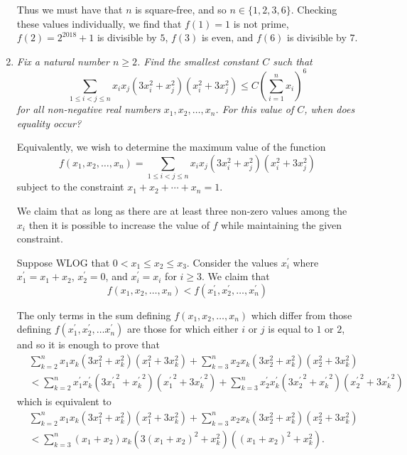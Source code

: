 \documentclass{article}
\begin{document}
\begin{enumerate}[1.]
Thus we must have that $n$ is square-free, and so $n \in \{1, 2, 3, 6\}$. Checking these values individually, we find that $f(1) = 1$ is not prime, $f(2) = 2^{2018} + 1$ is divisible by $5$, $f(3)$ is even, and $f(6)$ is divisible by $7$.


\vspace{6pt}
\item %
\textit{Fix a natural number $n \geq 2$. Find the smallest constant $C$ such that
\[
	 \sum_{1 \leq i < j \leq n} x_i x_j (3x_i^2 + x_j^2)(x_i^2 + 3x_j^2) \leq C {\left( \sum_{i = 1}^{n} x_i \right)}^6
\]
for all non-negative real numbers $x_1, x_2, \dots, x_n$. For this value of $C$, when does equality occur?}

Equivalently, we wish to determine the maximum value of the function
\[
	f(x_1, x_2, \dots, x_n) = \sum_{1 \leq i < j \leq n} x_i x_j (3x_i^2 + x_j^2)(x_i^2 + 3x_j^2)
\]
subject to the constraint $x_1 + x_2 + \cdots + x_n = 1$.

We claim that as long as there are at least three non-zero values among the $x_i$ then it is possible to increase the value of $f$ while maintaining the given constraint.

Suppose WLOG that $0 < x_1 \leq x_2 \leq x_3$. Consider the values $x_i^\prime$ where $x_1^\prime = x_1 + x_2$, $x_2^\prime = 0$, and $x_i^\prime = x_i$ for $i \geq 3$. We claim that
\[
	f(x_1, x_2, \dots, x_n) < f(x_1^\prime, x_2^\prime, \dots, x_n^\prime)
\]

The only terms in the sum defining $f(x_1, x_2, \dots, x_n)$ which differ from those defining $f(x_1^\prime, x_2^\prime, \dots x_n^\prime)$ are those for which either $i$ or $j$ is equal to $1$ or $2$, and so it is enough to prove that
\begin{align*}
	& \sum_{k = 2}^{n} x_1 x_k (3x_1^2 + x_k^2)(x_1^2 + 3x_k^2) + \sum_{k = 3}^{n} x_2 x_k (3x_2^2 + x_k^2)(x_2^2 + 3x_k^2) \\
	& <	\sum_{k = 2}^{n} x_1^\prime x_k^\prime (3{x_1^\prime}^2 + {x_k^\prime}^2)({x_1^\prime}^2 + 3{x_k^\prime}^2) + \sum_{k = 3}^{n} x_2^\prime x_k^\prime (3{x_2^\prime}^2 + {x_k^\prime}^2)({x_2^\prime}^2 + 3{x_k^\prime}^2)
\end{align*}
which is equivalent to
\begin{align*}
	& \sum_{k = 2}^{n} x_1 x_k (3x_1^2 + x_k^2)(x_1^2 + 3x_k^2) + \sum_{k = 3}^{n} x_2 x_k (3x_2^2 + x_k^2)(x_2^2 + 3x_k^2) \\
	& < \sum_{k = 3}^{n} (x_1 + x_2) x_k (3{(x_1 + x_2)}^2 + x_k^2)({(x_1 + x_2)}^2 + x_k^2).
\end{align*}


\end{enumerate}
\end{document}
